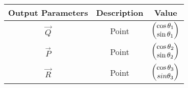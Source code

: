     \begin{tabular}{|c|c|c|}
    \hline
        \textbf{Output Parameters} &\textbf{Description} &\textbf{Value} \\
\hline
          $\vec{Q}$ & Point &$\begin{pmatrix}\cos{\theta_1}\\\sin{\theta_1}\end{pmatrix}$\\
          \hline
          $\vec{P}$ & Point &$\begin{pmatrix}\cos{\theta_2}\\\sin{\theta_2}\end{pmatrix}$ \\
         \hline
          $\vec{R}$ & Point &$\begin{pmatrix}\cos{\theta_3}\\sin{\theta_3}\end{pmatrix}$ \\
         \hline
    \end{tabular}
